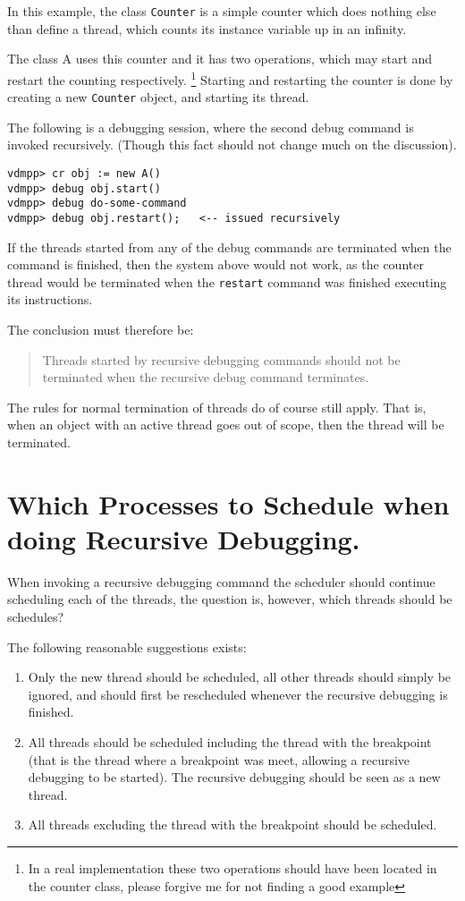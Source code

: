 \documentclass[]{article}
\begin{document}
In this example, the class \texttt{Counter} is a simple counter which does
nothing else than define a thread, which counts its instance variable up
in an infinity. 

The class A uses this counter and it has two operations, which may start
and restart the counting respectively. \footnote{In a real implementation
these two operations should have been located in the counter class, please
forgive me for not finding a good example}
Starting and restarting the counter is done by creating a new
\texttt{Counter} object, and starting its thread.

The following is a debugging session, where the second debug command is
invoked recursively. (Though this fact should not change much on the discussion).

\begin{verbatim}
vdmpp> cr obj := new A()
vdmpp> debug obj.start()
vdmpp> debug do-some-command
vdmpp> debug obj.restart();   <-- issued recursively
\end{verbatim}

If the threads started from any of the debug commands are terminated when
the command is finished, then the system above would not work, as the
counter thread would be terminated when the \texttt{restart} command was
finished executing its instructions.

The conclusion must therefore be: 
\begin{quote}
Threads started by recursive debugging commands should not be terminated
when the recursive debug command terminates. 
\end{quote}

The rules for normal termination of threads do of course still apply. That
is, when an object with an active thread goes out of scope, then the thread
will be terminated.





\section{Which Processes to Schedule when doing Recursive Debugging.}
When invoking a recursive debugging command the scheduler should continue scheduling each of the threads, the question is, however, which threads should be schedules?

The following reasonable suggestions exists:
\begin{enumerate}
\item Only the new thread should be scheduled, all other threads should
simply be ignored, and should first be rescheduled whenever the recursive
debugging is finished.
\item All threads should be scheduled including the thread with the
breakpoint (that is the thread where a breakpoint was meet, allowing a
recursive debugging to be started). The recursive debugging should be seen
as a new thread.
\item All threads excluding the thread with the breakpoint should be scheduled.
\end{enumerate}
\end{document}
